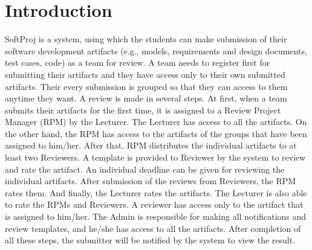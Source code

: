 %
\chapter{Introduction}
\label{sec:intro}

SoftProj is a system, using which the students can make submission of their software development artifacts (e.g., models, requirements and design documents, test cases, code) as a team for review. A team needs to register first for submitting their artifacts and they have access only to their own submitted artifacts. Their every submission is grouped so that they can access to them anytime they want. A review is made in several steps. At first, when a team submits their artifacts for the first time, it is assigned to a Review Project Manager (RPM) by the Lecturer. The Lecturer has access to all the artifacts. On the other hand, the RPM has access to the artifacts of the groups that have been assigned to him/her. After that, RPM distributes the individual artifacts to at least two Reviewers. A template is provided to Reviewer by the system to review and rate the artifact. An individual deadline can be given for reviewing the individual artifacts. After submission of the reviews from Reviewers, the RPM rates them. And finally, the Lecturer rates the artifacts. The Lecturer is also able to rate the RPMs and Reviewers. A reviewer has access only to the artifact that is assigned to him/her. The Admin is responsible for making all notifications and review templates, and he/she has access to all the artifacts. After completion of all these steps, the submitter will be notified by the system to view the result. 